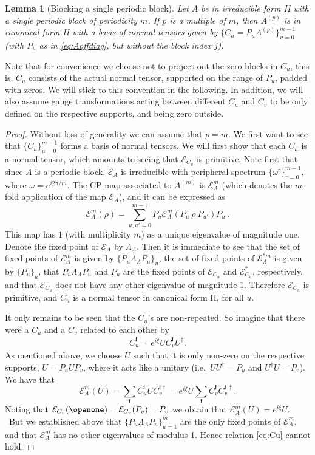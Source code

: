 \documentclass[pra,a4paper,notitlepage,nofootinbib,superscriptaddress]{revtex4-1}
\theoremstyle{plain}
\newtheorem{lemma}{Lemma}
\newcommand{\E}{\mathcal{E}}
\newcommand{\1}{{\openone}}
\newcommand{\be}{\begin{eqnarray}}
\newcommand{\ee}{\end{eqnarray}}
\begin{document}
\begin{lemma}[Blocking a single periodic block]
    \label{lem:bdcf}
    Let $A$ be in irreducible form II with a single periodic block of
    periodicity $m$.  If $p$ is a multiple of $m$, then $A^{(p)}$ is in
    canonical form II with a basis of normal tensors given by $\{C_u=P_u
        A^{(p)}\}_{u=0}^{m-1}$ (with $P_u$ as in \eqref{eq:Aoffdiag}, but without
    the block index $j$).
\end{lemma}

Note that for convenience we choose not to project out the zero blocks in
$C_u$, this is, $C_u$ consists of the actual normal tensor, supported on
the range of $P_u$, padded with zeros. We will stick to this convention in
the following. In addition, we will also assume gauge transformations
acting between different $C_u$ and $C_v$ to be only defined on the
respective supports, and being zero outside.


\begin{proof}
    Without loss of generality we can assume that $p=m$. We first want to see that  $\{C_u\}_{u=0}^{m-1}$ forms a basis of normal tensors.
    We will first show that each $C_u$ is a normal tensor,
    which amounts to seeing that $\E_{C_u}$ is primitive.
    Note first that since $A$ is a periodic block, $\E_A$ is irreducible with peripheral spectrum  $\{\omega^{r}\}_{r=0}^{m-1}$, where $\omega = e^{i2\pi/m}$.
    The CP map associated to $A^{(m)}$ is $\E_A^m$ (which denotes  the $m$-fold application of the map $\E_A$),
    and it can be expressed as
    $$
        \E_A^m(\rho) = \sum_{u,u'=0}^{m-1} P_u \E_A^m ( P_u\: \rho \: P_{u'}) P_{u'} .
    $$
    This map has $1$ (with multiplicity $m$) as a unique eigenvalue of magnitude one.
    Denote the fixed point of  $\E_{A}$ by $\Lambda_A$.
    Then it is immediate to see  that the set of fixed points of  $\E_A^m$ is given by $\{P_u\Lambda_A P_u\}_u$, the set of fixed points of $\E_A^{* m}$ is given by $\{P_u\}_u$,
    that  $P_u\Lambda_A P_u$ and $P_u$ are the fixed points of  $\E_{C_u}$ and $\E_{C_u}^*$,  respectively, and that $\E_{C_u}$ does not have any other eigenvalue of magnitude $1$. Therefore $\E_{C_u}$ is primitive, and  $C_u$ is a normal tensor in canonical form II, for all $u$.

    It only remains to be seen that the $C_u$'s are non-repeated.
    So imagine that there were a $C_u$ and a $C_v$ related to each other by
    \be
        C_u^{\mathbf{i}} = e^{i\xi} U C_v^{\mathbf{i}} U^\dagger . \label{eq:Cu}
    \ee
    As mentioned above, we choose $U$ such that it is only
    non-zero on the respective supports, $U=P_uUP_v$, where it acts like a
    unitary (i.e.\ $UU^\dagger=P_u$ and $U^\dagger U=P_v$).
    We have that
    $$
        \E_A^m(U) = \sum_{\mathbf{i}} C_u^\mathbf{i}   U  C_v^{\mathbf{i} \dagger} = e^{i\xi}U  \sum_{\mathbf{i}} C_v^{\mathbf{i}}C_v^{\mathbf{i}\: \dagger}.
    $$
    Noting that  $\E_{C_v}(\openone) =  \E_{C_v}(P_v) = P_v$ we obtain that $\E_A^m(U) = e^{i\xi}U$. \
    But we established above that $\{P_u\Lambda_A P_u\}_{u=1}^m$ are the only   fixed points of $\E_A^m$, and that $\E_A^m$ has no other eigenvalues of modulus 1.
    Hence relation \eqref{eq:Cu} cannot hold.
\end{proof}
\end{document}
